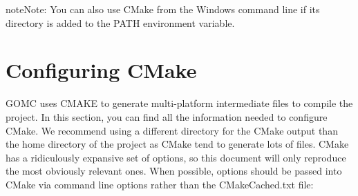 \documentclass[letterpaper,10pt,english]{sphinxmanual}
\begin{document}
\begin{sphinxadmonition}{note}{Note:}
You can also use CMake from the Windows command line if its directory is added to the PATH environment variable.
\end{sphinxadmonition}


\section{Configuring CMake}
\label{\detokenize{compiling:configuring-cmake}}
GOMC uses CMAKE to generate multi-platform intermediate files to compile the project. In this section, you can find all the information needed to configure CMake.
We recommend using a different directory for the CMake output than the home directory of the project as CMake tend to generate lots of files.
CMake has a ridiculously expansive set of options, so this document will only reproduce the most obviously relevant ones. When possible, options should be passed into CMake via command line options rather than the CMakeCached.txt file:
\end{document}
